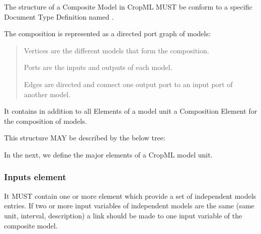 \documentclass[letterpaper,10pt,english]{sphinxmanual}
\begin{document}
\begin{DUlineblock}{0em}
\item[] The structure of a Composite Model in CropML MUST be conform to a specific Document Type Definition
named  .
\end{DUlineblock}

\begin{DUlineblock}{0em}
\item[] The composition is represented as a directed port graph of models:
\end{DUlineblock}
\begin{quote}

\begin{DUlineblock}{0em}
\item[] Vertices are the different models that form the composition.
\item[] Ports are the inputs and outputs of each model.
\item[] Edges are directed and connect one output port to an input port of another model.
\end{DUlineblock}
\end{quote}

\begin{DUlineblock}{0em}
\item[] It contains in addition to all Elements of a model unit a Composition Element for the composition of models.
\item[] This structure MAY be described by the below tree:
\end{DUlineblock}

\noindent{}

\begin{DUlineblock}{0em}
\item[] In the next, we define the major elements of a CropML model unit.
\end{DUlineblock}


\subsubsection{Inputs element}
\label{\detokenize{user/description:inputs-element}}
It MUST contain one or more  element which provide a set of independent models entries.
If two or more input variables of independent models are the same (same unit, interval, description)
a link should be made to one input variable of the composite model.
\end{document}
